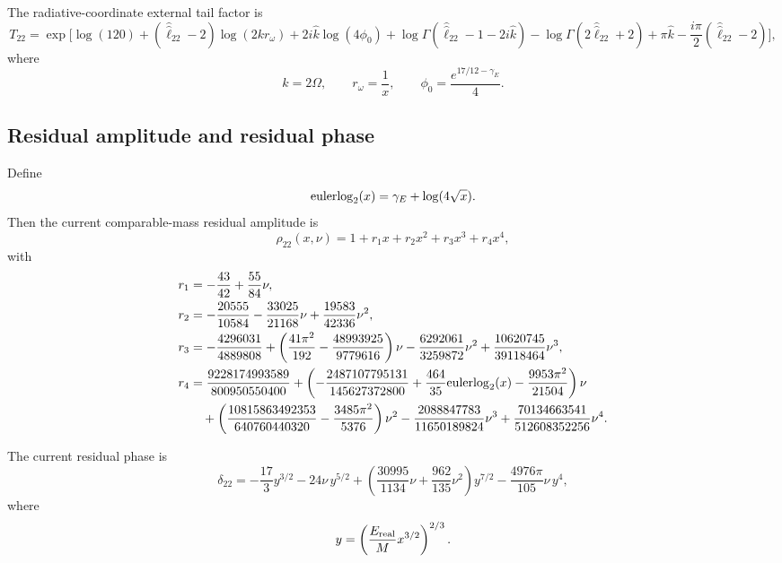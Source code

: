 \documentclass[11pt]{article}
\begin{document}
The radiative-coordinate external tail factor is
\begin{equation}
  T_{22}
  =
  \exp\!\Big[
    \log(120)
    + (\hat{\hat \ell}_{22}-2)\log(2kr_\omega)
    + 2i\hat k \log(4\phi_0)
    + \log\Gamma(\hat{\hat \ell}_{22}-1-2i\hat k)
    - \log\Gamma(2\hat{\hat \ell}_{22}+2)
    + \pi \hat k
    - \frac{i\pi}{2}(\hat{\hat \ell}_{22}-2)
  \Big],
\end{equation}
where
\begin{equation}
  k = 2\Omega,
  \qquad
  r_\omega = \frac{1}{x},
  \qquad
  \phi_0 = \frac{e^{17/12-\gamma_E}}{4}.
\end{equation}

\subsection{Residual amplitude and residual phase}

Define
\begin{equation}
  {\rm eulerlog}_2(x) = \gamma_E + \log(4\sqrt{x}).
\end{equation}
Then the current comparable-mass residual amplitude is
\begin{equation}
  \rho_{22}(x,\nu)
  =
  1 + r_1 x + r_2 x^2 + r_3 x^3 + r_4 x^4,
\end{equation}
with
\begin{align}
  r_1 &= -\frac{43}{42} + \frac{55}{84}\nu, \\
  r_2 &= -\frac{20555}{10584} - \frac{33025}{21168}\nu + \frac{19583}{42336}\nu^2, \\
  r_3 &=
  -\frac{4296031}{4889808}
  + \left(\frac{41\pi^2}{192} - \frac{48993925}{9779616}\right)\nu
  - \frac{6292061}{3259872}\nu^2
  + \frac{10620745}{39118464}\nu^3, \\
  r_4 &=
  \frac{9228174993589}{800950550400}
  + \left(
      -\frac{2487107795131}{145627372800}
      + \frac{464}{35}{\rm eulerlog}_2(x)
      - \frac{9953\pi^2}{21504}
    \right)\nu \nonumber \\
  &\quad
  + \left(
      \frac{10815863492353}{640760440320}
      - \frac{3485\pi^2}{5376}
    \right)\nu^2
  - \frac{2088847783}{11650189824}\nu^3
  + \frac{70134663541}{512608352256}\nu^4.
\end{align}

The current residual phase is
\begin{equation}
  \delta_{22}
  =
  -\frac{17}{3}y^{3/2}
  - 24\nu\,y^{5/2}
  + \left(
      \frac{30995}{1134}\nu + \frac{962}{135}\nu^2
    \right)y^{7/2}
  - \frac{4976\pi}{105}\nu\,y^4,
\end{equation}
where
\begin{equation}
  y = \left( \frac{E_{\rm real}}{M} x^{3/2} \right)^{2/3}.
\end{equation}
\end{document}
